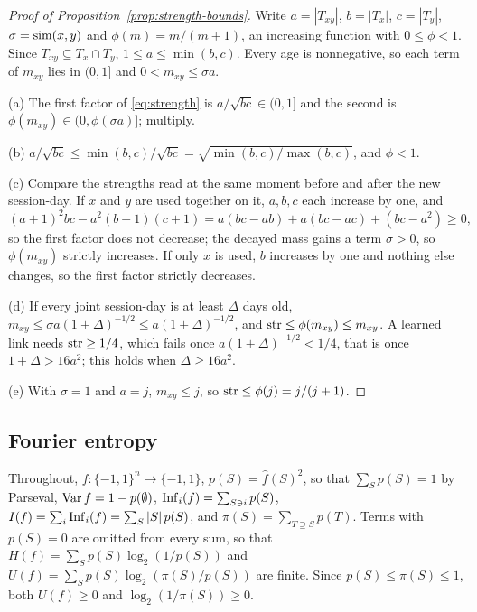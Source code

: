 \begin{proof}[Proof of Proposition~\ref{prop:strength-bounds}]\label{proof:prop:strength-bounds}
Write $a=|T_{xy}|$, $b=|T_x|$, $c=|T_y|$, $\sigma=\operatorname{sim}(x,y)$ and $\phi(m)=m/(m+1)$, an increasing function with $0\le\phi<1$. Since $T_{xy}\subseteq T_x\cap T_y$, $1\le a\le\min(b,c)$. Every age is nonnegative, so each term of $m_{xy}$ lies in $(0,1]$ and $0<m_{xy}\le\sigma a$.

(a) The first factor of \eqref{eq:strength} is $a/\sqrt{bc}\in(0,1]$ and the second is $\phi(m_{xy})\in(0,\phi(\sigma a)]$; multiply.

(b) $a/\sqrt{bc}\le\min(b,c)/\sqrt{bc}=\sqrt{\min(b,c)/\max(b,c)}$, and $\phi<1$.

(c) Compare the strengths read at the same moment before and after the new session-day. If $x$ and $y$ are used together on it, $a,b,c$ each increase by one, and
\[
(a+1)^2bc-a^2(b+1)(c+1)=a(bc-ab)+a(bc-ac)+(bc-a^2)\ge0,
\]
so the first factor does not decrease; the decayed mass gains a term $\sigma>0$, so $\phi(m_{xy})$ strictly increases. If only $x$ is used, $b$ increases by one and nothing else changes, so the first factor strictly decreases.

(d) If every joint session-day is at least $\Delta$ days old, $m_{xy}\le\sigma a(1+\Delta)^{-1/2}\le a(1+\Delta)^{-1/2}$, and $\operatorname{str}\le\phi(m_{xy})\le m_{xy}$. A learned link needs $\operatorname{str}\ge1/4$, which fails once $a(1+\Delta)^{-1/2}<1/4$, that is once $1+\Delta>16a^2$; this holds when $\Delta\ge16a^2$.

(e) With $\sigma=1$ and $a=j$, $m_{xy}\le j$, so $\operatorname{str}\le\phi(j)=j/(j+1)$.
\end{proof}

\subsection{Fourier entropy}

Throughout, $f:\{-1,1\}^n\to\{-1,1\}$, $p(S)=\hat f(S)^2$, so that $\sum_Sp(S)=1$ by Parseval, $\operatorname{Var} f=1-p(\emptyset)$, $\operatorname{Inf}_i(f)=\sum_{S\ni i}p(S)$, $I(f)=\sum_i\operatorname{Inf}_i(f)=\sum_S|S|\,p(S)$, and $\pi(S)=\sum_{T\supseteq S}p(T)$. Terms with $p(S)=0$ are omitted from every sum, so that $H(f)=\sum_Sp(S)\log_2(1/p(S))$ and $U(f)=\sum_Sp(S)\log_2(\pi(S)/p(S))$ are finite. Since $p(S)\le\pi(S)\le1$, both $U(f)\ge0$ and $\log_2(1/\pi(S))\ge0$.

